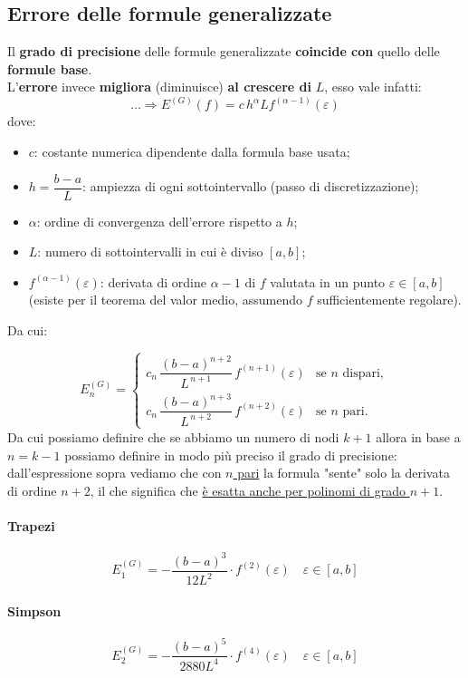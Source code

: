 \documentclass[12pt,a4paper,]{report}
\begin{document}
\subsection{Errore delle formule generalizzate}
Il \textbf{grado di precisione} delle formule generalizzate \textbf{coincide con} quello delle \textbf{formule base}.\\
L'\textbf{errore} invece \textbf{migliora} (diminuisce) \textbf{al crescere di} $L$, esso vale infatti:
\[
\dots \Longrightarrow E^{(G)}(f) = c\, h^\alpha  L  f^{(\alpha -1)} (\varepsilon)
\]
dove:
\begin{itemize}
    \item $c$: costante numerica dipendente dalla formula base usata;
    \item $h = \dfrac{b-a}{L}$: ampiezza di ogni sottointervallo (passo di discretizzazione);
    \item $\alpha$: ordine di convergenza dell'errore rispetto a $h$;
    \item $L$: numero di sottointervalli in cui è diviso $[a,b]$;
    \item $f^{(\alpha-1)}(\varepsilon)$: derivata di ordine $\alpha{-}1$ di $f$ valutata in un punto $\varepsilon \in [a,b]$ (esiste per il teorema del valor medio, assumendo $f$ sufficientemente regolare).
\end{itemize}
Da cui:
\begin{definizione}
    \[
    E_n^{(G)} =
    \begin{cases}
    c_n \, \dfrac{(b-a)^{n+2}}{L^{\,n+1}} \, f^{(n+1)}(\varepsilon)
    & \text{se $n$ dispari}, \\[8pt]
    c_n \, \dfrac{(b-a)^{n+3}}{L^{\,n+2}} \, f^{(n+2)}(\varepsilon)
    & \text{se $n$ pari}.
    \end{cases}
    \]
    Da cui possiamo definire che se abbiamo un numero di nodi $k+1$ allora in base a $n=k-1$ possiamo definire in modo più preciso il grado di precisione: dall'espressione sopra vediamo che con \uline{$n$ pari} la formula "sente" solo la derivata di ordine $n+2$, il che significa che \uline{è esatta anche per polinomi di grado $n+1$}.
\end{definizione}
\paragraph{Trapezi}
\[
E_1^{(G)} = - \frac{(b-a)^3}{12L^2} \cdot f^{(2)}(\varepsilon) \quad\varepsilon\in [a,b]
\]
\paragraph{Simpson}
\[
E_2^{(G)} = - \frac{(b-a)^5}{2880L^4} \cdot f^{(4)}(\varepsilon) \quad\varepsilon\in [a,b]
\]
\end{document}
